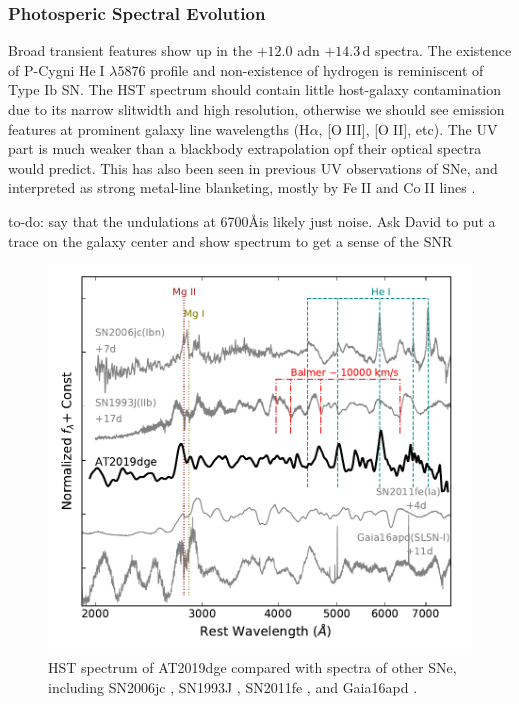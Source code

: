 \documentclass[twocolumn]{aastex63}
\def\ion#1#2{#1$\;${\footnotesize\rm{#2}}\relax}
\newcommand{\todo}[1]{{\color{magenta} to-do: {#1}}}
\begin{document}
\begin{CJK*}{UTF8}{gbsn}
\subsubsection{Photosperic Spectral Evolution}
Broad transient features show up in the $+12.0$ adn $+14.3$\,d spectra. The existence of P-Cygni 
\ion{He}{I} $\lambda5876$ profile and non-existence of hydrogen is reminiscent of Type Ib 
SN. The HST spectrum should contain little host-galaxy contamination due to its narrow 
slitwidth and high resolution, otherwise we should see emission features at prominent galaxy line 
wavelengths (H$\alpha$, [\ion{O}{III}], [\ion{O}{II}], etc). The UV part is much weaker than a blackbody 
extrapolation opf their optical spectra would predict. This has also been seen in previous UV 
observations of SNe, and interpreted as strong metal-line blanketing, mostly by \ion{Fe}{II} and 
\ion{Co}{II} lines \citep{Gal-Yam2008}.

\todo{say that the undulations at 6700\AA is likely just noise. Ask David to put a trace on the galaxy 
center and show spectrum to get a sense of the SNR}

\begin{figure}[htbp!]
	\centering
	\includegraphics[width=\columnwidth]{figures/hst_all.pdf}
	\caption{HST spectrum of AT2019dge compared with spectra of other SNe, including SN2006jc 
		\citep{Bufano2009}, SN1993J \citep{Jeffery1994}, SN2011fe \citep{Mazzali2014}, and Gaia16apd 
		\citep{Yan2017}.
		\label{fig:hst_all}}
\end{figure}


\end{CJK*}
\end{document}
